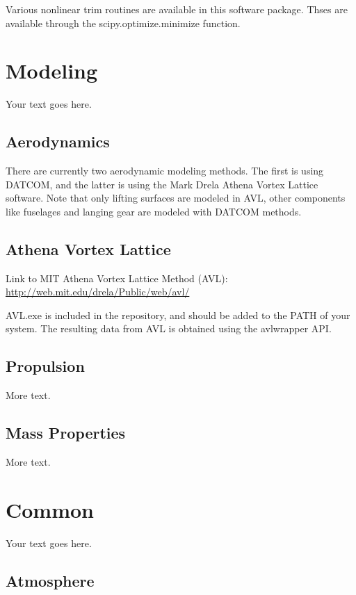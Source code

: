 \documentclass[11pt]{article} %
\begin{document}
Various nonlinear trim routines are available in this software package. Thses are available through the scipy.optimize.minimize function. 

\section{Modeling}

Your text goes here.

\subsection{Aerodynamics}

There are currently two aerodynamic modeling methods. The first is using DATCOM, and the latter is using the Mark Drela Athena Vortex Lattice software. Note that only lifting surfaces are modeled in AVL, other components like fuselages and langing gear are modeled with DATCOM methods. 

\subsection{Athena Vortex Lattice}

Link to MIT Athena Vortex Lattice Method (AVL): \\
\url{http://web.mit.edu/drela/Public/web/avl/}

AVL.exe is included in the repository, and should be added to the PATH of your system. The resulting data from AVL is obtained using the avlwrapper API. 

\subsection{Propulsion}

More text.

\subsection{Mass Properties}

More text.

\section{Common}

Your text goes here.

\subsection{Atmosphere}
\end{document}
